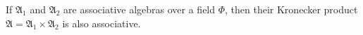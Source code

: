 If $\mathfrak{A}_1$ and $\mathfrak{A}_2$ are associative algebras over a field $\Phi$, then their Kronecker product $\mathfrak{A} = \mathfrak{A}_1 \times \mathfrak{A}_2$ is also associative.
